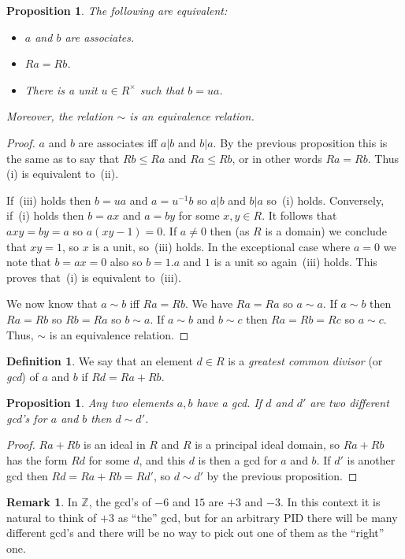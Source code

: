 \documentclass{amsart}
\newcommand{\Z}         {{\mathbb{Z}}}
\newcommand{\Rt}        {R^\times}
\renewcommand{\:}{\colon}
\newtheorem{proposition}[theorem]{Proposition}
\theoremstyle{definition}
\newtheorem{remark}[theorem]{Remark}
\newtheorem{definition}[theorem]{Definition}
\begin{document}
\begin{proposition}\label{prop-ass-inc}
 The following are equivalent:
 \begin{itemize}
  \item[(i)] $a$ and $b$ are associates.
  \item[(ii)] $Ra=Rb$.
  \item[(iii)] There is a unit $u\in\Rt$ such that $b=ua$.
 \end{itemize}
 Moreover, the relation $\sim$ is an equivalence relation.
\end{proposition}
\begin{proof}
 $a$ and $b$ are associates iff $a|b$ and $b|a$.  By the previous
 proposition this is the same as to say that $Rb\leq Ra$ and
 $Ra\leq Rb$, or in other words $Ra=Rb$.  Thus (i) is equivalent
 to~(ii).  

 If~(iii) holds then $b=ua$ and $a=u^{-1}b$ so $a|b$ and $b|a$ so~(i)
 holds.  Conversely, if~(i) holds then $b=ax$ and $a=by$ for some
 $x,y\in R$.  It follows that $axy=by=a$ so $a(xy-1)=0$.  If $a\neq 0$
 then (as $R$ is a domain) we conclude that $xy=1$, so $x$ is a unit,
 so~(iii) holds.  In the exceptional case where $a=0$ we note that
 $b=ax=0$ also so $b=1.a$ and $1$ is a unit so again~(iii) holds.
 This proves that~(i) is equivalent to~(iii).

 We now know that $a\sim b$ iff $Ra=Rb$.  We have $Ra=Ra$ so
 $a\sim a$.  If $a\sim b$ then $Ra=Rb$ so $Rb=Ra$ so $b\sim a$.  If
 $a\sim b$ and $b\sim c$ then $Ra=Rb=Rc$ so $a\sim c$.  Thus, $\sim$
 is an equivalence relation.
\end{proof}

\begin{definition}
 We say that an element $d\in R$ is a \emph{greatest common divisor}
 (or \emph{gcd}) of $a$ and $b$ if $Rd=Ra+Rb$.
\end{definition}
\begin{proposition}
 Any two elements $a,b$ have a gcd.  If $d$ and $d'$ are two different
 gcd's for $a$ and $b$ then $d\sim d'$.
\end{proposition}
\begin{proof}
 $Ra+Rb$ is an ideal in $R$ and $R$ is a principal ideal domain, so
 $Ra+Rb$ has the form $Rd$ for some $d$, and this $d$ is then a gcd
 for $a$ and $b$.  If $d'$ is another gcd then $Rd=Ra+Rb=Rd'$, so
 $d\sim d'$ by the previous proposition.
\end{proof}
\begin{remark}
 In $\Z$, the gcd's of $-6$ and $15$ are $+3$ and $-3$.  In this
 context it is natural to think of $+3$ as ``the'' gcd, but for an
 arbitrary PID there will be many different gcd's and there will be no
 way to pick out one of them as the ``right'' one.
\end{remark}
\end{document}
